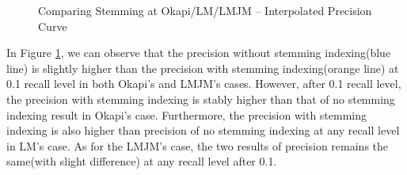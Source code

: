 \documentclass[10pt, a4paper]{article}
\begin{document}
\begin{figure}[h!]
\caption{Comparing Stemming at Okapi/LM/LMJM -- Interpolated Precision Curve}
\label{fig:stemming_i}
\end{figure}

In Figure \ref{fig:stemming_i}, we can observe that the precision without stemming indexing(blue line) is slightly higher than the precision with stemming indexing(orange line) at 0.1 recall level in both Okapi's and LMJM's cases. However, after 0.1 recall level, the precision with stemming indexing is stably higher than that of no stemming indexing result in Okapi's case. Furthermore, the precision with stemming indexing is also higher than precision of no stemming indexing at any recall level in LM's case. As for the LMJM's case, the two results of precision remains the same(with slight difference) at any recall level after 0.1.
\end{document}
